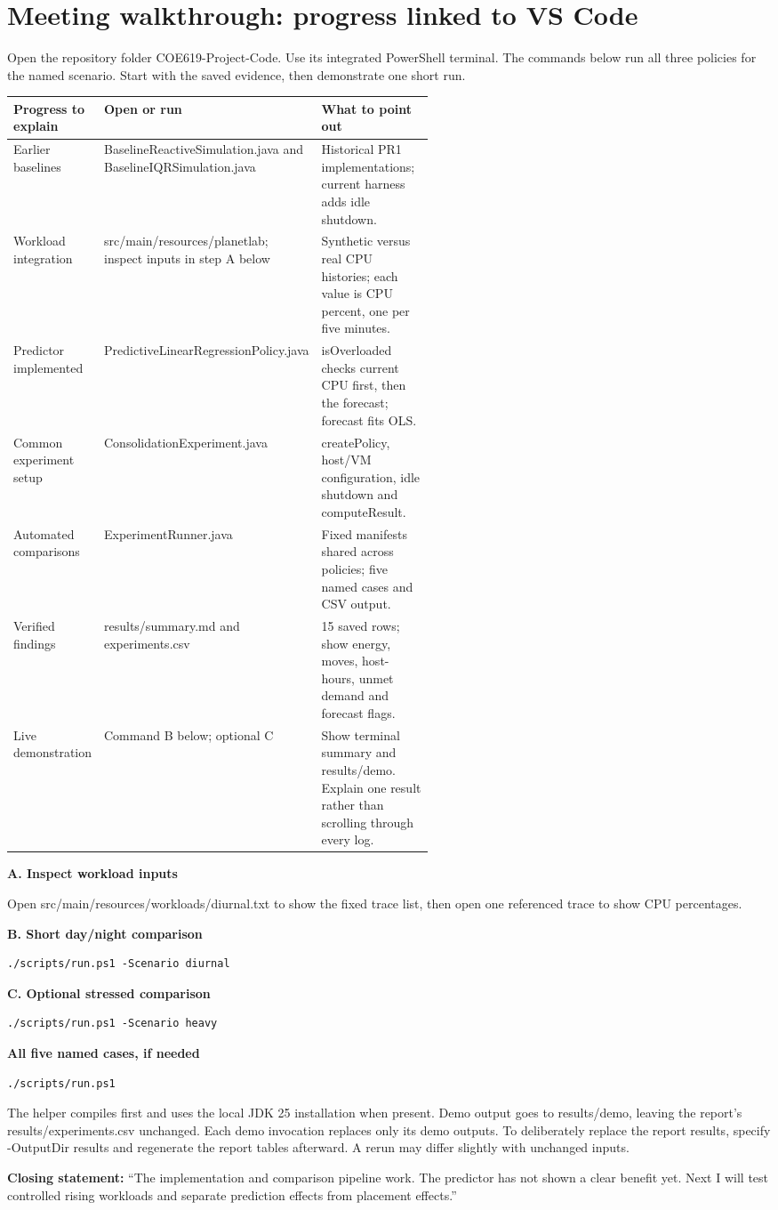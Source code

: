\documentclass[11pt,a4paper]{article}
\begin{document}
\section{Meeting walkthrough: progress linked to VS Code}
Open the repository folder COE619-Project-Code. Use its integrated PowerShell terminal. The commands below run all three policies for the named scenario. Start with the saved evidence, then demonstrate one short run.
\begin{center}\small
\begin{tabularx}{\linewidth}{@{}p{0.20\linewidth}p{0.35\linewidth}X@{}}\toprule
Progress to explain & Open or run & What to point out\\\midrule
Earlier baselines & BaselineReactiveSimulation.java and BaselineIQRSimulation.java & Historical PR1 implementations; current harness adds idle shutdown.\\[5pt]
Workload integration & src/main/resources/planetlab; inspect inputs in step A below & Synthetic versus real CPU histories; each value is CPU percent, one per five minutes.\\[5pt]
Predictor implemented & PredictiveLinearRegressionPolicy.java & isOverloaded checks current CPU first, then the forecast; forecast fits OLS.\\[5pt]
Common experiment setup & ConsolidationExperiment.java & createPolicy, host/VM configuration, idle shutdown and computeResult.\\[5pt]
Automated comparisons & ExperimentRunner.java & Fixed manifests shared across policies; five named cases and CSV output.\\[5pt]
Verified findings & results/summary.md and experiments.csv & 15 saved rows; show energy, moves, host-hours, unmet demand and forecast flags.\\[5pt]
Live demonstration & Command B below; optional C & Show terminal summary and results/demo. Explain one result rather than scrolling through every log.\\\bottomrule
\end{tabularx}\end{center}
\textbf{A. Inspect workload inputs}\par
Open src/main/resources/workloads/diurnal.txt to show the fixed trace list, then open one referenced trace to show CPU percentages.
\par
\textbf{B. Short day/night comparison}
\begin{verbatim}
./scripts/run.ps1 -Scenario diurnal
\end{verbatim}
\textbf{C. Optional stressed comparison}
\begin{verbatim}
./scripts/run.ps1 -Scenario heavy
\end{verbatim}
\textbf{All five named cases, if needed}
\begin{verbatim}
./scripts/run.ps1
\end{verbatim}
The helper compiles first and uses the local JDK 25 installation when present. Demo output goes to results/demo, leaving the report's results/experiments.csv unchanged. Each demo invocation replaces only its demo outputs. To deliberately replace the report results, specify -OutputDir results and regenerate the report tables afterward. A rerun may differ slightly with unchanged inputs.

\textbf{Closing statement:} ``The implementation and comparison pipeline work. The predictor has not shown a clear benefit yet. Next I will test controlled rising workloads and separate prediction effects from placement effects.''
\end{document}
